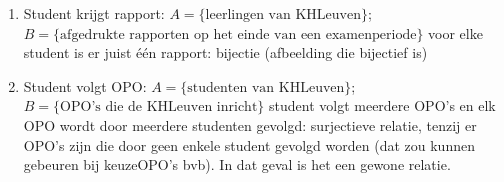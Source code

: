 \begin{oef}
\begin{opl}
\begin{enumerate}
\item Student krijgt rapport: $A=\{\text{leerlingen van KHLeuven}\}$; \\
$B=\{\text{afgedrukte rapporten op het einde van een examenperiode}\}$ voor elke student is er juist \'e\'en rapport: bijectie (afbeelding die bijectief is)

\item Student volgt OPO: $A=\{\text{studenten van KHLeuven}\}$; \\
$B=\{\text{OPO's die de KHLeuven inricht}\}$ student volgt meerdere OPO's en elk OPO wordt door meerdere studenten gevolgd: surjectieve relatie, tenzij er OPO's zijn die door geen enkele student gevolgd worden (dat zou kunnen gebeuren bij keuzeOPO's bvb). In dat geval is het een gewone relatie.
\end{enumerate}

\end{opl}
\end{oef}

